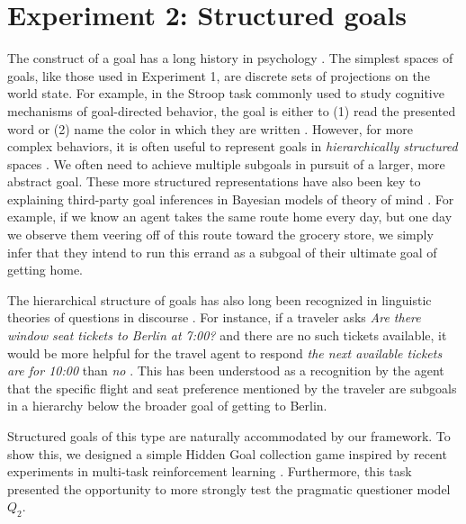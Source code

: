 \documentclass[12pt, floatsintext, jou]{apa6}
\begin{document}
\section{Experiment 2: Structured goals}

The construct of a goal has a long history in psychology \cite{miller1960plans, Schank:1977hh, austin1996goal}.
The simplest spaces of goals, like those used in Experiment 1, are discrete sets of projections on the world state.
For example, in the Stroop task commonly used to study cognitive mechanisms of goal-directed behavior, the goal is either to (1) read the presented word or (2) name the color in which they are written \cite{miller2001integrative}.
However, for more complex behaviors, it is often useful to represent goals in \emph{hierarchically structured} spaces \cite{badre2008cognitive,botvinick2008hierarchical}. 
We often need to achieve multiple subgoals in pursuit of a larger, more abstract goal. 
These more structured representations have also been key to explaining third-party goal inferences in Bayesian models of theory of mind \cite{BakerSaxeTenenbaum09_ActionUnderstandingInversePlanning}. 
For example, if we know an agent takes the same route home every day, but one day we observe them veering off of this route toward the grocery store, we simply infer that they intend to run this errand as a subgoal of their ultimate goal of getting home. 

The hierarchical structure of goals has also long been recognized in linguistic theories of questions in discourse  \cite{Kuppevelt95_TopicalityDiscourse,Roberts96_InformationStructureDiscourse,Buring03_DtreesBeansBaccents,Groenendijk99_LogicOfInterrogation,rojas2014discourse}.
For instance, if a traveler asks \emph{Are there window seat tickets to Berlin at 7:00?} and there are no such tickets available, it would be more helpful for the travel agent to respond \emph{the next available tickets are for 10:00} than \emph{no} \cite{rojas2013roadsigns}.
This has been understood as a recognition by the agent that the specific flight and seat preference mentioned by the traveler are subgoals in a hierarchy below the broader goal of getting to Berlin. 

Structured goals of this type are naturally accommodated by our framework. 
To show this, we designed a simple Hidden Goal collection game inspired by recent experiments in multi-task reinforcement learning \cite{oh2017zero, andreas2017modular}.
Furthermore, this task presented the opportunity to more strongly test the pragmatic questioner model $Q_2$.
\end{document}
